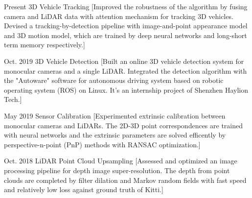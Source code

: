 \documentclass{resume}
\begin{document}
\begin{experiences}
  \experience%
    {Present}%
    {3D Vehicle Tracking}%
    [Improved the robustness of the algorithm by fusing camera and LiDAR data with attention mechanism for tracking 3D vehicles. Devised a tracking-by-detection pipeline with image-and-point appearance model and 3D motion model, which are trained by deep neural networks and long-short term memory respectively.]

\separator{0.5ex}

  \experience%
    {Oct. 2019}%
    {3D Vehicle Detection}%
    [Built an online 3D vehicle detection system for monocular cameras and a single LiDAR. Integrated the detection algorithm with the "Autoware" software for autonomous driving system based on robotic operating system (ROS) on Linux. It's an internship project of Shenzhen Haylion Tech.] 

\separator{0.5ex}

  \experience%
    {May 2019}%
    {Sensor Calibration}%
    [Experimented extrinsic calibration between monocular cameras and LiDARs. The 2D-3D point correspondences are trained with neural networks and the extrinsic parameters are solved efficently by perspective-n-point (PnP) methods with RANSAC optimization.]

\separator{0.5ex}

  \experience%
    {Oct. 2018}%
    {LiDAR Point Cloud Upsampling}%
    [Assessed and optimized an image processing pipeline for depth image super-resolution. The depth from point clouds are completed by filter dilation and Markov random fields with fast speed and relatively low loss against ground truth of Kitti.]   
    

\end{experiences}

\begin{competences}[12em]
\end{competences}
\end{document}
